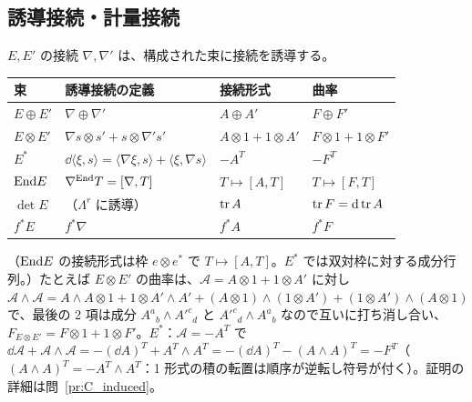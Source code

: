 \subsection{誘導接続・計量接続}
\label{C:ss:unitary}
$E,E'$ の接続 $\nabla,\nabla'$ は、構成された束に接続を誘導する。

\begin{center}
\begin{tabular}{llll}
\toprule
束 & 誘導接続の定義 & 接続形式 & 曲率\\
\midrule
$E\oplus E'$ & $\nabla\oplus\nabla'$ & $A\oplus A'$ & $F\oplus F'$\\
$E\otimes E'$ & $\nabla s\otimes s'+s\otimes\nabla's'$ & $A\otimes1+1\otimes A'$ & $F\otimes1+1\otimes F'$\\
$E^*$ & $\dd\langle\xi,s\rangle=\langle\nabla\xi,s\rangle+\langle\xi,\nabla s\rangle$ & $-A^T$ & $-F^T$\\
$\mathrm{End} E$ & $\nabla^{\mathrm{End}}T=[\nabla,T]$ & $T\mapsto[A,T]$ & $T\mapsto[F,T]$\\
$\det E$ & （$\Lambda^r$ に誘導） & $\operatorname{tr} A$ & $\operatorname{tr} F=\mathrm{d}\operatorname{tr} A$\\
$f^*E$ & $f^*\nabla$ & $f^*A$ & $f^*F$\\
\bottomrule
\end{tabular}
\end{center}
（$\mathrm{End} E$ の接続形式は枠 $e\otimes e^*$ で $T\mapsto[A,T]$。$E^*$ では双対枠に対する成分行列。）たとえば $E\otimes E'$ の曲率は、$\mathcal A=A\otimes1+1\otimes A'$ に対し $\mathcal A\wedge\mathcal A=A\wedge A\otimes1+1\otimes A'\wedge A'+(A\otimes1)\wedge(1\otimes A')+(1\otimes A')\wedge(A\otimes1)$ で、最後の 2 項は成分 $A^a{}_b\wedge A'^c{}_d$ と $A'^c{}_d\wedge A^a{}_b$ なので互いに打ち消し合い、$F_{E\otimes E'}=F\otimes1+1\otimes F'$。$E^*$：$\mathcal A=-A^T$ で $\dd\mathcal A+\mathcal A\wedge\mathcal A=-(\dd A)^T+A^T\wedge A^T=-(\dd A)^T-(A\wedge A)^T=-F^T$（$(A\wedge A)^T=-A^T\wedge A^T$：1 形式の積の転置は順序が逆転し符号が付く）。証明の詳細は問~\ref{pr:C_induced}。


